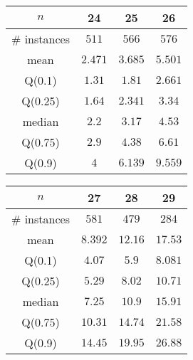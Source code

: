 \begin{tabular}{c|ccc} 
\hline 
$n$ & 24 & 25 & 26 \tabularnewline 
\hline 
\hline 
\# instances & $511$ & $566$ & $576$ \tabularnewline 
mean & $2.471$ & $3.685$ & $5.501$ \tabularnewline 
Q(0.1) & $1.31$ & $1.81$ & $2.661$ \tabularnewline 
Q(0.25) & $1.64$ & $2.341$ & $3.34$ \tabularnewline 
median & $2.2$ & $3.17$ & $4.53$ \tabularnewline 
Q(0.75) & $2.9$ & $4.38$ & $6.61$ \tabularnewline 
Q(0.9) & $4$ & $6.139$ & $9.559$ \tabularnewline 
\hline 
\end{tabular} 
\medskip{} 

\begin{tabular}{c|ccc} 
\hline 
$n$ & 27 & 28 & 29 \tabularnewline 
\hline 
\hline 
\# instances & $581$ & $479$ & $284$ \tabularnewline 
mean & $8.392$ & $12.16$ & $17.53$ \tabularnewline 
Q(0.1) & $4.07$ & $5.9$ & $8.081$ \tabularnewline 
Q(0.25) & $5.29$ & $8.02$ & $10.71$ \tabularnewline 
median & $7.25$ & $10.9$ & $15.91$ \tabularnewline 
Q(0.75) & $10.31$ & $14.74$ & $21.58$ \tabularnewline 
Q(0.9) & $14.45$ & $19.95$ & $26.88$ \tabularnewline 
\hline 
\end{tabular} 
\medskip{} 

